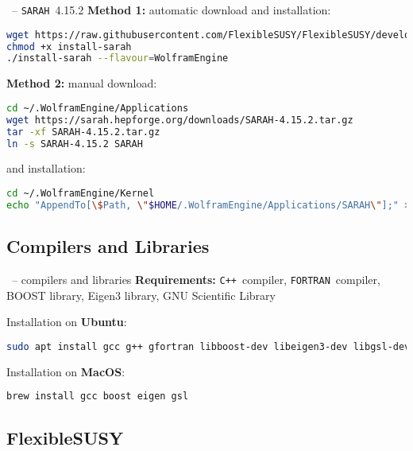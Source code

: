 \documentclass[11pt]{beamer}
\newcommand{\CXX}{\texttt{C++}}
\newcommand{\FORTRAN}{\texttt{FORTRAN}}
\newcommand{\SARAH}{\texttt{SARAH}}
\begin{document}

\begin{frame}[fragile]{\insertsection\ -- \SARAH\ 4.15.2}
  \textbf{Method 1:} automatic download and installation:
  \begin{lstlisting}[language=sh,basicstyle=\scriptsize\ttfamily]
wget https://raw.githubusercontent.com/FlexibleSUSY/FlexibleSUSY/development/install-sarah
chmod +x install-sarah
./install-sarah --flavour=WolframEngine\end{lstlisting}
  \textbf{Method 2:} manual download:
  \begin{lstlisting}[language=sh,basicstyle=\scriptsize\ttfamily]
cd ~/.WolframEngine/Applications
wget https://sarah.hepforge.org/downloads/SARAH-4.15.2.tar.gz
tar -xf SARAH-4.15.2.tar.gz
ln -s SARAH-4.15.2 SARAH\end{lstlisting}
  and installation:
  \begin{lstlisting}[language=sh,basicstyle=\scriptsize\ttfamily]
cd ~/.WolframEngine/Kernel
echo "AppendTo[\$Path, \"$HOME/.WolframEngine/Applications/SARAH\"];" >> init.m
\end{lstlisting}%
\end{frame}


\subsection{Compilers and Libraries}

\begin{frame}[fragile]{\insertsection\ -- compilers and libraries}
  \textbf{Requirements:} \CXX\ compiler, \FORTRAN\ compiler, BOOST
  library, Eigen3 library, GNU Scientific Library

  \bigskip

  Installation on \textbf{Ubuntu}:
  \begin{lstlisting}[language=sh]
sudo apt install gcc g++ gfortran libboost-dev libeigen3-dev libgsl-dev dpkg-dev\end{lstlisting}
  Installation on \textbf{MacOS}:
  \begin{lstlisting}[language=sh]
brew install gcc boost eigen gsl\end{lstlisting}
\end{frame}


\subsection{FlexibleSUSY}
\end{document}
